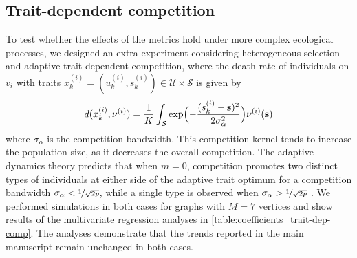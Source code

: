 \subsection{Trait-dependent competition}\label{secSI:trait-dep-comp}
To test whether the effects of the metrics hold under more complex ecological processes, we designed an extra experiment considering heterogeneous selection and adaptive trait-dependent competition, where the death rate of individuals on $v_i$ with traits $x_k^{(i)} = (u_k^{(i)}, s_k^{(i)}) \in \mathcal{U} \times \mathcal{S}$ is given by
\begin{equation}
    d(x_k^{(i)}, \nu^{(i)}) = \frac{1}{K}\int_{\mathcal{S}} \exp\Bigl(-\frac{(s_k^{(i)} - {\textbf s})^2}{2\sigma_\alpha^{2}} \Bigr) \nu^{(i)}({\textbf s})
\end{equation}
where $\sigma_\alpha$ is the competition bandwidth.
This competition kernel tends to increase the population size, as it decreases the overall competition. The adaptive dynamics theory predicts that when $m = 0$, competition promotes two distinct types of individuals at either side of the adaptive trait optimum for a competition bandwidth $\sigma_\alpha < \nicefrac{1}{\sqrt{2p}}$, while a single type is observed when $\sigma_\alpha > \nicefrac{1}{\sqrt{2p}}$ \cite{DoebeliMichael2011Ad}.
We performed simulations in both cases for graphs with $M=7$ vertices and show results of the multivariate regression analyses in \cref{table:coefficients_trait-dep-comp}.
The analyses demonstrate that the trends reported in the main manuscript remain unchanged in both cases.

